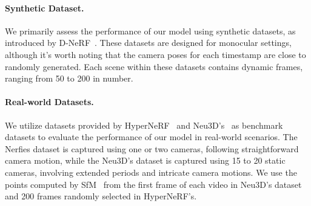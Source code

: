 
\paragraph{Synthetic Dataset.}We primarily assess the performance of our model using synthetic datasets, as introduced by D-NeRF~\cite{pumarola2021dnerf}. These datasets are designed for monocular settings, although it's worth noting that the camera poses for each timestamp are close to randomly generated. Each scene within these datasets contains dynamic frames, ranging from 50 to 200 in number.
\paragraph{Real-world Datasets.} We utilize datasets provided by HyperNeRF~\cite{park2021hypernerf} and Neu3D's~\cite{li2022neural} as benchmark datasets to evaluate the performance of our model in real-world scenarios. The Nerfies dataset is captured using one or two cameras, following straightforward camera motion, while the Neu3D's dataset is captured using 15 to 20 static cameras, involving extended periods and intricate camera motions. We use the points computed by SfM~\cite{schonberger2016structure} from the first frame of each video in Neu3D's dataset and 200 frames randomly selected in HyperNeRF's.
